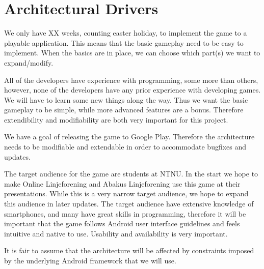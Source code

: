 \section{Architectural Drivers} 
\label{sec:architecturaldrivers}


We only have XX weeks, counting easter holiday, to implement the game to a playable application. This means that the basic gameplay need to be easy to implement. When the basics are in place, we can choose which part(s) we want to expand/modify.

All of the developers have experience with programming, some more than others, however, none of the developers have any prior experience with developing games. We will have to learn some new things along the way. Thus we want the basic gameplay to be simple, while more advanced features are a bonus. Therefore extendibility and modifiability are both very important for this project.

We have a goal of releasing the game to Google Play. Therefore the architecture needs to be modifiable and extendable in order to accommodate bugfixes and updates. 

The target audience for the game are students at NTNU. In the start we hope to make Online Linjeforening and Abakus Linjeforening use this game at their presentations. While this is a very narrow target audience, we hope to expand this audience in later updates. The target audience have extensive knowledge of smartphones, and many have great skills in programming, therefore it will be important that the game follows Android user interface guidelines and feels intuitive and native to use. Usability and availability is very important.

It is fair to assume that the architecture will be affected by constraints imposed by the underlying Android framework that we will use.
